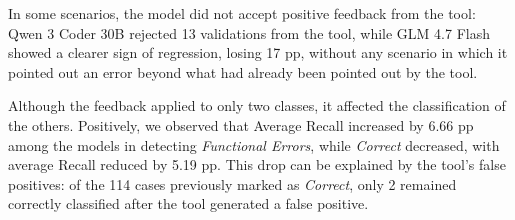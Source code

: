 In some scenarios, the model did not accept positive feedback from the tool: Qwen 3 Coder 30B rejected 13 validations from the tool, while GLM 4.7 Flash showed a clearer sign of regression, losing 17 pp, without any scenario in which it pointed out an error beyond what had already been pointed out by the tool.

Although the feedback applied to only two classes, it affected the classification of the others. Positively, we observed that Average Recall increased by 6.66 pp among the models in detecting \emph{Functional Errors}, while \emph{Correct} decreased, with average Recall reduced by 5.19 pp. This drop can be explained by the tool's false positives: of the 114 cases previously marked as \emph{Correct}, only 2 remained correctly classified after the tool generated a false positive.
